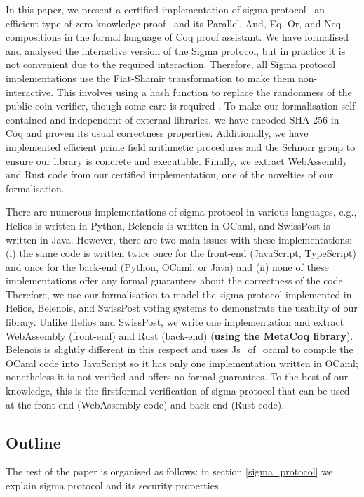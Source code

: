 \documentclass[conference,compsoc]{IEEEtran}
\begin{document}
In this paper, we present a certified implementation of sigma protocol --an efficient 
type of zero-knowledge proof-- and its Parallel, And, Eq, Or, and Neq compositions in 
the formal language of Coq proof assistant. 
We have formalised and analysed the interactive version of 
the Sigma protocol, but in practice it is not convenient due to the required interaction. 
Therefore, all Sigma protocol implementations use the Fiat-Shamir 
transformation \cite{10.5555/36664.36676} to make them non-interactive. This involves 
using a hash function to replace the randomness of the public-coin verifier, though 
some care is required \cite{10.1007/978-3-642-34961-4_38}.
To make our formalisation self-contained and independent of external libraries, we have 
encoded SHA-256 in Coq and proven its usual correctness properties. Additionally, we 
have implemented efficient prime field arithmetic procedures and the Schnorr group to 
ensure our library is concrete and executable. Finally, we extract WebAssembly and 
Rust code from our certified implementation, one of the novelties of our 
formalisation.


There are numerous implementations of sigma protocol in various languages, 
e.g., Helios is written in Python, Belenois is written in OCaml, and SwissPost is written in Java.
However, there are two main issues with these implementations: 
(i) the same code is written twice 
once for the front-end (JavaScript, TypeScript) and once for the back-end (Python, OCaml, or Java) and 
(ii) none of these implementations offer any formal guarantees about the correctness of the code.
Therefore, we use our formalisation to model the sigma protocol implemented in Helios, 
Belenois, and SwissPost voting systems to demonstrate the usablity of 
our library. Unlike Helios and SwissPost,
we write one implementation and extract WebAssembly (front-end) and Rust (back-end) (\textbf{using the MetaCoq library}).
Belenois is slightly different in this respect and uses Js\_of\_ocaml 
to compile the OCaml code into JavaScript so it has only one 
implementation written in OCaml; nonetheless it is not verified 
and offers no formal guarantees. To the best of our knowledge, 
this is the firstformal verification of sigma protocol that can be used at 
the front-end (WebAssembly code) and back-end (Rust code). 

\subsection{Outline}
The rest of the paper is organised as follows: in section \ref{sigma_protocol}
we explain sigma protocol and its security properties. 
\end{document}
